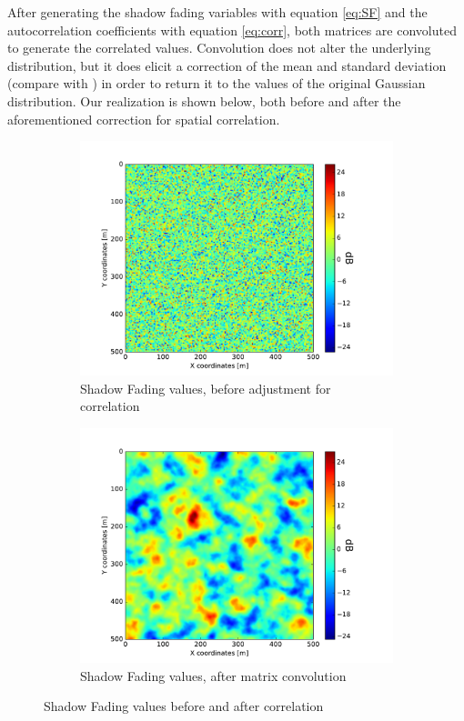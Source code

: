 After generating the shadow fading variables with equation \ref{eq:SF} and the autocorrelation coefficients with equation \ref{eq:corr}, both matrices are convoluted to generate the correlated values. Convolution does not alter the underlying distribution, but it does elicit a correction of the mean and standard deviation (compare with \cite{Forkel2004}) in order to return it to the values of the original Gaussian distribution. Our realization is shown below, both before and after the aforementioned correction for spatial correlation.

\begin{figure}
\centering
\begin{subfigure}{.45\textwidth}
  \centering
  \includegraphics[width=1.2\linewidth]{figures/noise_before}
  \caption{Shadow Fading values, before adjustment for correlation}
  \label{fig:sf_no_correlation}
\end{subfigure}%
\begin{subfigure}{.45\textwidth}
  \centering
  \includegraphics[width=1.2\linewidth]{figures/noise_after}
  \caption{Shadow Fading values, after matrix convolution}
  \label{fig:sf_correlated}
\end{subfigure}
\caption{Shadow Fading values before and after correlation}
\label{fig:SF}
\end{figure}